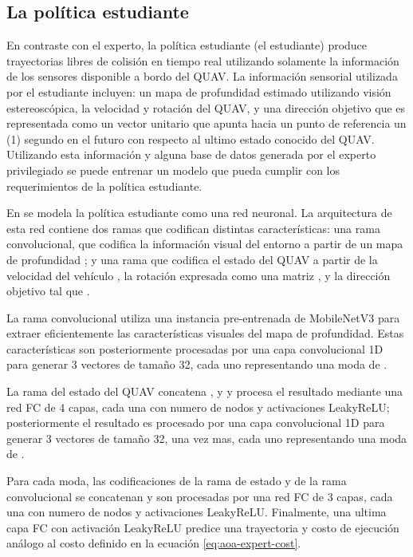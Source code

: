 \subsection{La política estudiante} 

\label{sec:aoa-student}

En contraste con el experto, la política estudiante (el estudiante) produce trayectorias libres de colisión en tiempo real utilizando solamente la información de los sensores disponible a bordo del QUAV. La información sensorial utilizada por el estudiante incluyen: un mapa de profundidad estimado utilizando visión estereoscópica, la velocidad y rotación del QUAV, y una dirección objetivo que es representada como un vector unitario que apunta hacia un punto de referencia un (1) segundo en el futuro con respecto al ultimo estado conocido del QUAV. Utilizando esta información y alguna base de datos generada por el experto privilegiado se puede entrenar un modelo que pueda cumplir con los requerimientos de la política estudiante.

En \cite{Loquercio2021} se modela la política estudiante como una red neuronal. La arquitectura de esta red contiene dos ramas que codifican distintas características: una rama convolucional, que codifica la información visual del entorno a partir de un mapa de profundidad ; y una rama que codifica el estado del QUAV a partir de la velocidad del vehículo , la rotación expresada como una matriz , y la dirección objetivo  tal que . 

La rama convolucional utiliza una instancia pre-entrenada de MobileNetV3 \cite{Howard2019} para extraer eficientemente las características visuales del mapa de profundidad. Estas características son posteriormente procesadas por una capa convolucional 1D para generar 3 vectores de tamaño 32, cada uno representando una moda de . 

La rama del estado del QUAV concatena ,  y  y procesa el resultado mediante una red FC de 4 capas, cada una con \jim{[64,32,32,32]} numero de nodos y activaciones LeakyReLU; posteriormente el resultado es procesado por una capa convolucional 1D para generar 3 vectores de tamaño 32, una vez mas, cada uno representando una moda de .

Para cada moda, las codificaciones de la rama de estado y de la rama convolucional se concatenan y son procesadas por una red FC de 3 capas, cada una con \jim{[64,128,128]} numero de nodos y activaciones LeakyReLU. Finalmente, una ultima capa FC con activación LeakyReLU predice una trayectoria \jim{\tau} y costo de ejecución análogo al costo definido en la ecuación \ref{eq:aoa-expert-cost}. 



